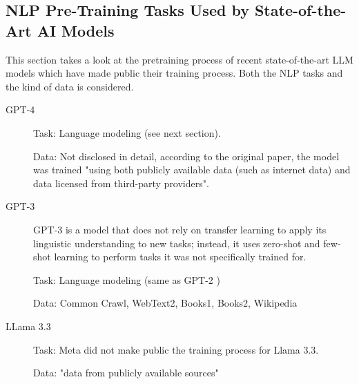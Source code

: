 \subsection{NLP Pre-Training Tasks Used by State-of-the-Art AI Models}
This section takes a look at the pretraining process of recent state-of-the-art LLM models which have made public their training process.
Both the NLP tasks and the kind of data is considered.


\begin{description}
	\item[GPT-4] \cite{openaiGPT4TechnicalReport2024}

	      Task: Language modeling (see next section).

	      Data: Not disclosed in detail, according to the original paper, the model was trained "using both publicly available data (such as internet data) and data licensed from third-party providers".
	\item[GPT-3] \cite{brownLanguageModelsAre2020}
	      GPT-3 is a model that does not rely on transfer learning to apply its linguistic understanding to new tasks; instead, it uses zero-shot and few-shot learning to perform tasks it was not specifically trained for.

	      Task: Language modeling (same as GPT-2 \cite{radfordLanguageModelsAre2019})

	      Data: Common Crawl, WebText2, Books1, Books2, Wikipedia 
	\item[LLama 3.3] \cite{LlamamodelsModelsLlama3_3}


	      Task: Meta did not make public the training process for Llama 3.3.

	      Data: "data from publicly available sources"
\end{description}


